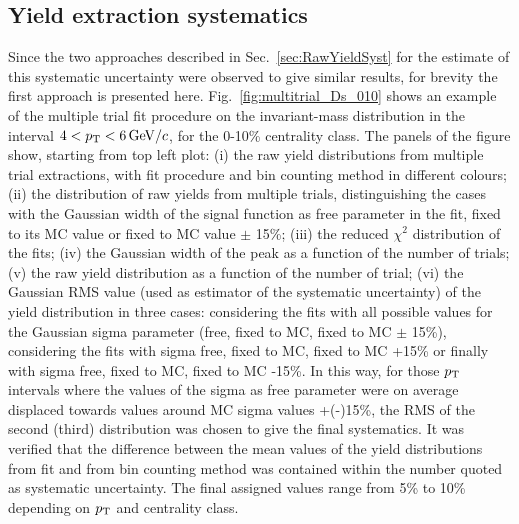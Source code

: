 \subsection{Yield extraction systematics}
\label{sec:YieldExsystAA}
Since the two approaches described in 
Sec.~\ref{sec:RawYieldSyst} for the estimate of this 
systematic uncertainty were observed to give similar results,
for brevity the first approach is presented here. Fig.~\ref{fig:multitrial_Ds_010}
shows an example of the multiple trial fit procedure on the invariant-mass
distribution in the interval $4 < p_{\rm T} < 6 \, \mathrm{GeV}/c$, for the 0-10\% centrality class.
The panels of the figure show, starting from top left plot:
(i) the raw yield distributions from multiple trial extractions, 
with fit procedure and bin counting method 
in different colours; (ii) the distribution of raw yields from multiple 
trials, distinguishing the cases with the Gaussian width of the signal function as free parameter 
in the fit, fixed to its MC value or fixed to MC value $\pm$ 15\%; 
(iii) the reduced $\chi^{2}$ distribution of the fits; 
(iv) the Gaussian width of the peak as a function of the 
number of trials; (v) the raw yield distribution as a 
function of the number of trial; (vi) the Gaussian RMS value (used as
estimator of the systematic uncertainty) of the yield distribution
in three cases: considering the fits with 
all possible values for the Gaussian sigma parameter (free, fixed to MC, fixed to MC $\pm$ 15\%), 
considering the fits with sigma free, fixed to MC, fixed to 
MC +15\% or finally with sigma free, fixed to MC, fixed to MC -15\%. 
In this way, for those $p_{\rm T}$ intervals where the values 
of the sigma as free parameter were on average displaced towards 
values around MC sigma values +(-)15\%, the RMS of the second (third) 
distribution was chosen to give the final systematics. 
It was verified that the difference between the mean values of the yield distributions from fit
and from bin counting method was contained within the number quoted 
as systematic uncertainty.
The final assigned values range from 5\% to 10\% depending on $p_{\rm T}$ and
centrality class. 




